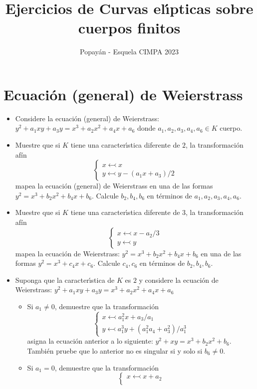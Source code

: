 \documentclass[a4paper,10pt]{article}
\title{Ejercicios de Curvas el\'{\i}pticas sobre cuerpos finitos}
\author{Popayán - Esquela CIMPA 2023}
\begin{document}
\maketitle
\section{Ecuaci\'on (general) de Weierstrass}
\begin{itemize}
 \item Considere la ecuaci\'on (general) de Weierstrass:
 $y^2+a_1xy+a_3y=x^3+a_2x^2+a_4x+a_6$
donde $a_1,a_2,a_3,a_4,a_6\in K$ cuerpo.
 \item Muestre que si $K$ tiene una caracter\'\i stica diferente de $2$, la transformaci\'on af\'in
 $$\left\{\begin{array}{l}
 x\leftarrowtail x\\
 y \leftarrowtail y-(a_1x+a_3)/2
          \end{array}
\right.$$
mapea la ecuaci\'on (general) de Weierstrass en una de las formas $y^2=x^3+b_2x^2+b_4x+b_6$. Calcule $b_2, b_4, b_6$ en t\'erminos de $a_1, a_2, a_3, a_4, a_6$.
\item  Muestre que si $K$ tiene una caracter\'\i stica diferente de $3$, la transformaci\'on af\'in
 $$\left\{\begin{array}{l}
 x\leftarrowtail x-a_2/3\\
 y\leftarrowtail y
          \end{array}
\right.$$
mapea la ecuaci\'on de Weierstrass:  $y^2=x^3+b_2x^2+b_4x+b_6$ en una de las formas $y^2=x^3+c_4x+c_6$. Calcule $c_4, c_6$ en t\'erminos de $b_ 2, b_ 4, b_ 6$.
\item Suponga que la caracter\'{\i}stica de $K$ es $2$ y considere la ecuaci\'on de Weierstrass:  $y^2+a_1xy+a_3y=x^3+a_2x^2+a_4x+a_6$
\begin{itemize}
 \item Si $a_1\ne0$, demuestre que la transformaci\'on
 $$\left\{\begin{array}{l}
 x\leftarrowtail a_1^2x+a_3/a_1\\
 y\leftarrowtail a_1^3y+(a_1^2a_4+a_3^2)/a_1^3
          \end{array}
\right.$$
asigna la ecuaci\'on anterior a lo siguiente:
$y^2+xy=x^3+b_2x^2+b_6$. Tambi\'en pruebe que lo anterior no es singular si y solo si $b_6\ne0$.
\item 
Si $a_1=0$, demuestre que la transformaci\'on
$$\left\{\begin{array}{l}
 x\leftarrowtail x+a_2\\

\end{array}$$
\end{itemize}
\end{itemize}
\end{document}
